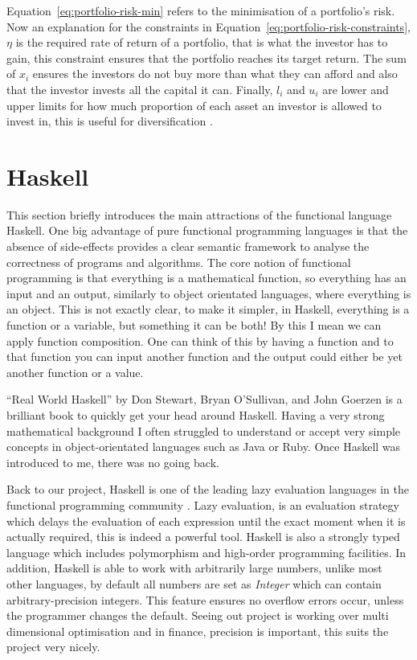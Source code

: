 \documentclass{pdfmx4020}
\begin{document}
  Equation~\ref{eq:portfolio-risk-min} refers to the minimisation of a portfolio's risk. Now an explanation for the constraints in Equation~\ref{eq:portfolio-risk-constraints}, $\eta$ is the required rate of return of a portfolio, that is what the investor has to gain, this constraint ensures that the portfolio reaches its target return. The sum of $x_i$ ensures the investors do not buy more than what they can afford and also that the investor invests all the capital it can. Finally, $l_i$ and $u_i$ are lower and upper limits for how much proportion of each asset an investor is allowed to invest in, this is useful for diversification \cite{diversification}. 

  
  \section{Haskell} %
  \label{sec:haskell}
  This section briefly introduces the main attractions of the functional language Haskell. One big advantage of pure functional programming languages is that the absence of side-effects provides a clear semantic framework to analyse the correctness of programs and algorithms. The core notion of functional programming is that everything is a mathematical function, so everything has an input and an output, similarly to object orientated languages, where everything is an object. This is not exactly clear, to make it simpler, in Haskell, everything is a function or a variable, but something it can be both! By this I mean we can apply function composition. One can think of this by having a function and to that function you can input another function and the output could either be yet another function or a value. 

  ``Real World Haskell'' by Don Stewart, Bryan O'Sullivan, and John Goerzen is a brilliant book to quickly get your head around Haskell. Having a very strong mathematical background I often struggled to understand or accept very simple concepts in object-orientated languages such as Java or Ruby. Once Haskell was introduced to me, there was no going back.

  Back to our project, Haskell is one of the leading lazy evaluation languages in the functional programming community \cite{lazy}. Lazy evaluation, is an evaluation strategy which delays the evaluation of each expression until the exact moment when it is actually required, this is indeed a powerful tool. Haskell is also a strongly typed language which includes polymorphism and high-order programming facilities. In addition, Haskell is able to work with arbitrarily large numbers, unlike most other languages, by default all numbers are set as \textit{Integer} which can contain arbitrary-precision integers. This feature ensures no overflow errors occur, unless the programmer changes the default. Seeing out project is working over multi dimensional optimisation and in finance, precision is important, this suits the project very nicely.
\end{document}
